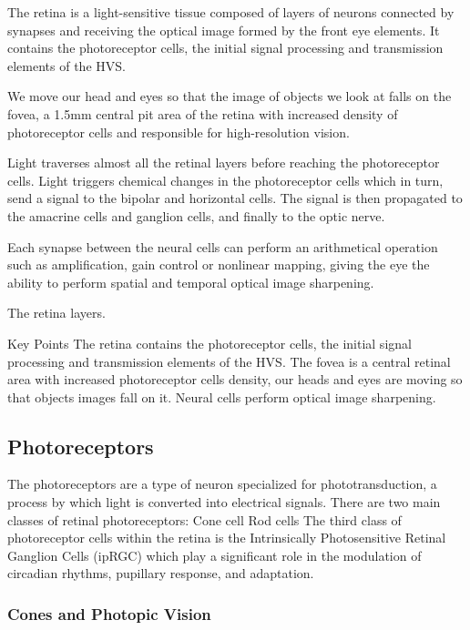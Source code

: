 The retina is a light-sensitive tissue composed of layers of neurons connected by synapses and receiving the optical image formed by the front eye elements. It contains the photoreceptor cells, the initial signal processing and transmission elements of the HVS.

We move our head and eyes so that the image of objects we look at falls on the fovea, a 1.5mm central pit area of the retina with increased density of photoreceptor cells and responsible for high-resolution vision.

Light traverses almost all the retinal layers before reaching the photoreceptor cells. Light triggers chemical changes in the photoreceptor cells which in turn, send a signal to the bipolar and horizontal cells. The signal is then propagated to the amacrine cells and ganglion cells, and finally to the optic nerve.


Each synapse between the neural cells can perform an arithmetical operation such as amplification, gain control or nonlinear mapping, giving the eye the ability to perform spatial and temporal optical image sharpening.


The retina layers.

Key Points
The retina contains the photoreceptor cells, the initial signal processing and transmission elements of the HVS.
The fovea is a central retinal area with increased photoreceptor cells density, our heads and eyes are moving so that objects images fall on it.
Neural cells perform optical image sharpening.

\subsection{Photoreceptors}%
\label{subsec:photoreceptors}

The photoreceptors are a type of neuron specialized for phototransduction, a process by which light is converted into electrical signals. There are two main classes of retinal photoreceptors:
Cone cell
Rod cells
The third class of photoreceptor cells within the retina is the Intrinsically Photosensitive Retinal Ganglion Cells (ipRGC) which play a significant role in the modulation of circadian rhythms, pupillary response, and adaptation.

\subsubsection{Cones and Photopic Vision}%
\label{subsubsec:cones-and-photopic-vision}

